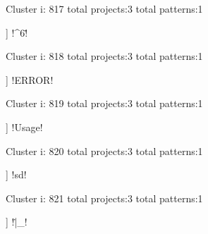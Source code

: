 Cluster i: 817
total projects:3
total patterns:1
\begin{multicols}{1}
\begin{description}[noitemsep,topsep=0pt]
\item [[3] ] \cverb!^6\.!
\end{description}
\end{multicols}







Cluster i: 818
total projects:3
total patterns:1
\begin{multicols}{1}
\begin{description}[noitemsep,topsep=0pt]
\item [[3] ] \cverb!ERROR!
\end{description}
\end{multicols}







Cluster i: 819
total projects:3
total patterns:1
\begin{multicols}{1}
\begin{description}[noitemsep,topsep=0pt]
\item [[3] ] \cverb!Usage!
\end{description}
\end{multicols}







Cluster i: 820
total projects:3
total patterns:1
\begin{multicols}{1}
\begin{description}[noitemsep,topsep=0pt]
\item [[3] ] \cverb!sd\w!
\end{description}
\end{multicols}







Cluster i: 821
total projects:3
total patterns:1
\begin{multicols}{1}
\begin{description}[noitemsep,topsep=0pt]
\item [[3] ] \cverb!\.|_!
\end{description}
\end{multicols}








